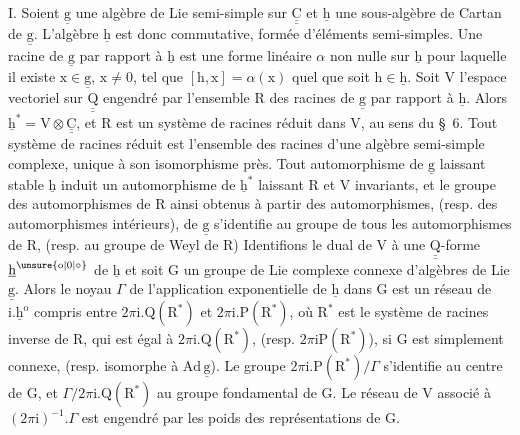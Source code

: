 I. Soient $\underline{\mathrm g}$ une algèbre de Lie semi-simple sur $\underline{\underline{\mathrm C}}$ et $\underline{\mathrm h}$ une sous-algèbre de Cartan de $\underline{\mathrm g}$. L'algèbre $\underline{\mathrm h}$ est donc commutative, formée d'éléments semi-simples. Une racine de $\underline{\mathrm g}$ par rapport à $\underline{\mathrm h}$ est une forme linéaire $\alpha$ non nulle sur $\underline{\mathrm h}$ pour laquelle il existe $\mathrm x\in\underline{\mathrm g}$, $\mathrm x\ne0$, tel que $[\mathrm h,\mathrm x]=\alpha(\mathrm x)$ quel que soit $\mathrm h\in\underline{\mathrm h}$. Soit $\mathrm V$ l'espace vectoriel sur $\underline{\underline{\mathrm Q}}$ engendré par l'ensemble $\mathrm R$ des racines de $\underline{\mathrm g}$ par rapport à $\underline{\mathrm h}$. Alors $\underline{\mathrm h}^{*}=\mathrm V\otimes\underline{\underline{\mathrm C}}$, et $\mathrm R$ est un système de racines réduit dans $\mathrm V$, au sens du \S~6. Tout système de racines réduit est l'ensemble des racines d'une algèbre semi-simple complexe, unique à son isomorphisme près. Tout automorphisme de $\underline{\mathrm g}$ laissant stable $\underline{\mathrm h}$ induit un automorphisme de $\underline{\mathrm h}^{*}$ laissant $\mathrm R$ et $\mathrm V$ invariants, et le groupe des automorphismes de $\mathrm R$ ainsi obtenus à partir des automorphismes, (resp. des automorphismes intérieurs), de $\underline{\mathrm g}$ s'identifie au groupe de tous les automorphismes de $\mathrm R$, (resp. au groupe de Weyl de $\mathrm R$) Identifions le dual de $\mathrm V$ à une $\underline{\underline{\mathrm Q}}$-forme $\underline{\mathrm h}^{\unsure{\mathrm o|0|\circ}}$ de $\underline{\mathrm h}$ et soit $\mathrm G$ un groupe de Lie complexe connexe d'algèbres de Lie $\underline{\mathrm g}$. Alors le noyau $\Gamma$ de l'application exponentielle de $\underline{\mathrm h}$ dans $\mathrm G$ est un réseau de $\mathrm i.\underline{\mathrm h}^{\mathrm o}$ compris entre $2\pi\mathrm i.\mathrm Q(\mathrm R^{*})$ et $2\pi\mathrm i.\mathrm P(\mathrm R^{*})$, où $\mathrm R^{*}$ est le système de racines inverse de $\mathrm R$, qui est égal à $2\pi\mathrm i.\mathrm Q(\mathrm R^{*})$, (resp. $2\pi\mathrm i\mathrm P(\mathrm R^{*})$), si $\mathrm G$ est simplement connexe, (resp. isomorphe à $\mathrm{Ad}\,\underline{\mathrm g}$). Le groupe $2\pi\mathrm i.\mathrm P(\mathrm R^{*})/\Gamma$ s'identifie au centre de $\mathrm G$, et $\Gamma/2\pi\mathrm i.\mathrm Q(\mathrm R^{*})$ au groupe fondamental de $\mathrm G$. Le réseau de $\mathrm V$ associé à $(2\pi\mathrm i)^{-1}.\Gamma$ est engendré par les poids des représentations de $\mathrm G$.

